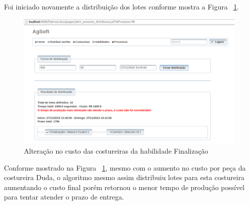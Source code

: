 \par Foi iniciado novamente a distribuição dos lotes conforme mostra a Figura
~\ref{fig:resultado2_teste6}.

\begin{figure}[h!]
	\centerline{\includegraphics[scale=0.3]{./imagens/resultado2_teste6.png}}
	\caption[Resultado da distribuição após alteração no custo da costureira Duda] 
	{Alteração no custo das costureiras da habilidade Finalização}
	\label{fig:resultado2_teste6}
\end{figure}

\par Conforme mostrado na Figura ~\ref{fig:resultado2_teste6}, mesmo com o
aumento no custo por peça da costureira Duda, o algoritmo mesmo assim distribuiu
lotes para esta costureira aumentando o custo final porém retornou o
menor tempo de produção possível para tentar atender o prazo de entrega.

